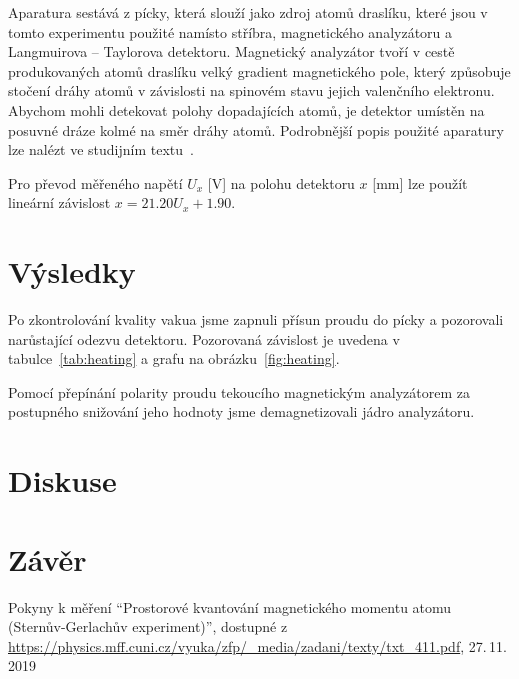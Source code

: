 \documentclass{scirep}
\begin{document}
    Aparatura sestává z pícky, která slouží jako zdroj atomů draslíku, které jsou v tomto experimentu použité namísto stříbra, magnetického analyzátoru a Langmuirova – Taylorova detektoru.
    Magnetický analyzátor tvoří v cestě produkovaných atomů draslíku velký gradient magnetického pole, který způsobuje stočení dráhy atomů v závislosti na spinovém stavu jejich valenčního elektronu.
    Abychom mohli detekovat polohy dopadajících atomů, je detektor umístěn na posuvné dráze kolmé na směr dráhy atomů.
    Podrobnější popis použité aparatury lze nalézt ve studijním textu~\cite{pokyny}.

    Pro převod měřeného napětí $U_x$ [V] na polohu detektoru $x$ [mm] lze použít lineární závislost $x = \num{21,20}  U_x + \num{1,90}$.


    \section*{Výsledky}

    Po zkontrolování kvality vakua jsme zapnuli přísun proudu do pícky a pozorovali narůstající odezvu detektoru.
    Pozorovaná závislost je uvedena v tabulce~\ref{tab:heating} a grafu na obrázku~\ref{fig:heating}.

    Pomocí přepínání polarity proudu tekoucího magnetickým analyzátorem za postupného snižování jeho hodnoty jsme demagnetizovali jádro analyzátoru.



    \section*{Diskuse}

    \section*{Závěr}

    \begin{thebibliography}{}

        Pokyny k měření ``Prostorové kvantování magnetického momentu atomu (Sternův-Gerlachův experiment)'', dostupné z\\ \url{https://physics.mff.cuni.cz/vyuka/zfp/_media/zadani/texty/txt_411.pdf}, 27.\,11.\,2019

    \end{thebibliography}
\end{document}
